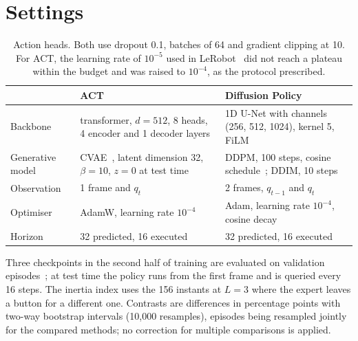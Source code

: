 \documentclass[10pt,a4paper]{article}
\begin{document}
\begin{table}[h]
  \centering\small
  \caption{Sanity checks on 10 training episodes at $L=2$ (3{,}000 iterations). The last column is the largest change in the predicted actions when the presentation frames are replaced; it must be zero for B0 and positive for the other variants.}
  \label{tab:unit}
  
\end{table}

\section{Settings}
\label{app:settings}

\begin{table}[h]
  \centering\small
  \caption{Action heads. Both use dropout 0.1, batches of 64 and gradient clipping at 10. For ACT, the learning rate of $10^{-5}$ used in LeRobot~\citep{cadene2024lerobot} did not reach a plateau within the budget and was raised to $10^{-4}$, as the protocol prescribed.}
  \label{tab:heads}
  \begin{tabular}{p{2.3cm}p{6.5cm}p{6.5cm}}
    \toprule
    & ACT & Diffusion Policy \\
    \midrule
    Backbone & transformer, $d=512$, 8 heads, 4 encoder and 1 decoder layers & 1D U-Net with channels (256, 512, 1024), kernel 5, FiLM \\
    Generative model & CVAE~\citep{sohn2015cvae}, latent dimension 32, $\beta=10$, $z=0$ at test time & DDPM, 100 steps, cosine schedule~\citep{nichol2021improved}; DDIM, 10 steps \\
    Observation & 1 frame and $q_t$ & 2 frames, $q_{t-1}$ and $q_t$ \\
    Optimiser & AdamW, learning rate $10^{-4}$ & Adam, learning rate $10^{-4}$, cosine decay \\
    Horizon & 32 predicted, 16 executed & 32 predicted, 16 executed \\
    \bottomrule
  \end{tabular}
\end{table}

Three checkpoints in the second half of training are evaluated on validation episodes~\citep{mandlekar2021matters}; at test time the policy runs from the first frame and is queried every 16 steps. The inertia index uses the 156 instants at $L=3$ where the expert leaves a button for a different one. Contrasts are differences in percentage points with two-way bootstrap intervals (10{,}000 resamples), episodes being resampled jointly for the compared methods; no correction for multiple comparisons is applied.
\end{document}
